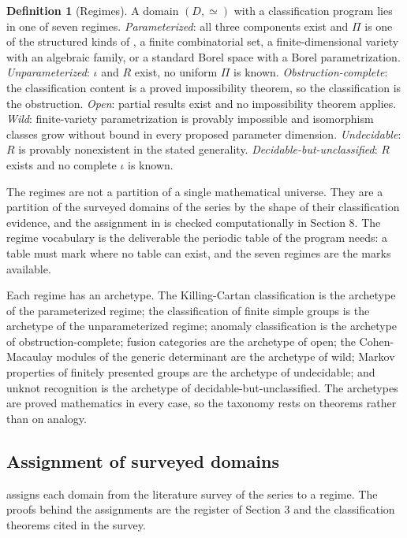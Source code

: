 \documentclass[11pt,letterpaper]{article}
\theoremstyle{definition}
\newtheorem{definition}[theorem]{Definition}
\theoremstyle{remark}
\begin{document}
\begin{definition}[Regimes]
\label{def:regime}
A domain $(D, \simeq)$ with a classification program lies in one of seven regimes. \emph{Parameterized}: all three components exist and $\Pi$ is one of the structured kinds of , a finite combinatorial set, a finite-dimensional variety with an algebraic family, or a standard Borel space with a Borel parametrization. \emph{Unparameterized}: $\iota$ and $R$ exist, no uniform $\Pi$ is known. \emph{Obstruction-complete}: the classification content is a proved impossibility theorem, so the classification is the obstruction. \emph{Open}: partial results exist and no impossibility theorem applies. \emph{Wild}: finite-variety parametrization is provably impossible and isomorphism classes grow without bound in every proposed parameter dimension. \emph{Undecidable}: $R$ is provably nonexistent in the stated generality. \emph{Decidable-but-unclassified}: $R$ exists and no complete $\iota$ is known.
\end{definition}

The regimes are not a partition of a single mathematical universe. They are a partition of the surveyed domains of the series by the shape of their classification evidence, and the assignment in  is checked computationally in Section 8. The regime vocabulary is the deliverable the periodic table of the program needs: a table must mark where no table can exist, and the seven regimes are the marks available.

Each regime has an archetype. The Killing-Cartan classification is the archetype of the parameterized regime; the classification of finite simple groups is the archetype of the unparameterized regime; anomaly classification is the archetype of obstruction-complete; fusion categories are the archetype of open; the Cohen-Macaulay modules of the generic determinant are the archetype of wild; Markov properties of finitely presented groups are the archetype of undecidable; and unknot recognition is the archetype of decidable-but-unclassified. The archetypes are proved mathematics in every case, so the taxonomy rests on theorems rather than on analogy.

\subsection{Assignment of surveyed domains}

 assigns each domain from the literature survey of the series to a regime. The proofs behind the assignments are the register of Section 3 and the classification theorems cited in the survey.
\end{document}
